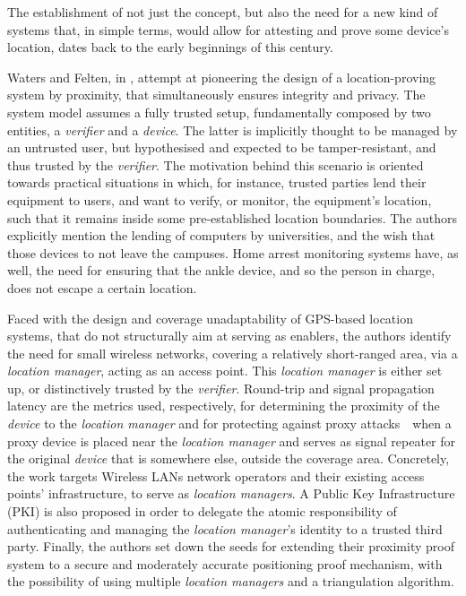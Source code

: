 The establishment of not just the concept, but also the need for a new kind of systems that, in simple terms, would allow for attesting and prove some device's location, dates back to the early beginnings of this century. 

Waters and Felten, in \cite{waters2003secure}, attempt at pioneering the design of a location-proving system by proximity, that simultaneously ensures integrity and privacy. The system model assumes a fully trusted setup, fundamentally composed by two entities, a \emph{verifier} and a \emph{device}. The latter is implicitly thought to be managed by an untrusted user, but hypothesised and expected to be tamper-resistant, and thus trusted by the \emph{verifier}. The motivation behind this scenario is oriented towards practical situations in which, for instance, trusted parties lend their equipment to users, and want to verify, or monitor, the equipment's location, such that it remains inside some pre-established location boundaries. The authors explicitly mention the lending of computers by universities, and the wish that those devices to not leave the campuses. Home arrest monitoring systems have, as well, the need for ensuring that the ankle device, and so the person in charge, does not escape a certain location. 

Faced with the design and coverage unadaptability of GPS-based location systems, that do not structurally aim at serving as \pol{} enablers, the authors identify the need for small wireless networks, covering a relatively short-ranged area, via a \emph{location manager}, acting as an access point. This \emph{location manager} is either set up, or distinctively trusted by the \emph{verifier}. Round-trip and signal propagation latency are the metrics used, respectively, for determining the proximity of the \emph{device} to the \emph{location manager} and for protecting against proxy attacks~\textemdash~when a proxy device is placed near the \emph{location manager} and serves as signal repeater for the original \emph{device} that is somewhere else, outside the coverage area. Concretely, the work targets Wireless LANs network operators and their existing access points' infrastructure, to serve as \emph{location managers}. A Public Key Infrastructure (PKI) is also proposed in order to delegate the atomic responsibility of authenticating and managing the \emph{location manager}'s identity to a trusted third party. Finally, the authors set down the seeds for extending their proximity proof system to a secure and moderately accurate positioning proof mechanism, with the possibility of using multiple \emph{location managers} and a triangulation algorithm.

